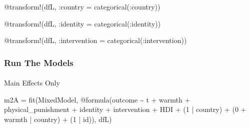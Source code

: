\documentclass[
  letterpaper,
  DIV=11,
  numbers=noendperiod]{scrreprt}
\makeatletter
\let\oldparagraph\paragraph
\renewcommand{\paragraph}{
    \@ifstar
      \xxxParagraphStar
      \xxxParagraphNoStar
  }
\newcommand{\xxxParagraphStar}[1]{\oldparagraph*{#1}\mbox{}}
\newcommand{\xxxParagraphNoStar}[1]{\oldparagraph{#1}\mbox{}}
\newenvironment{Shaded}{\begin{snugshade}}{\end{snugshade}}
\newcommand{\FloatTok}[1]{\textcolor[rgb]{0.68,0.00,0.00}{#1}}
\newcommand{\FunctionTok}[1]{\textcolor[rgb]{0.28,0.35,0.67}{#1}}
\newcommand{\NormalTok}[1]{\textcolor[rgb]{0.00,0.23,0.31}{#1}}
\newcommand{\OperatorTok}[1]{\textcolor[rgb]{0.37,0.37,0.37}{#1}}
\newcommand{\PreprocessorTok}[1]{\textcolor[rgb]{0.68,0.00,0.00}{#1}}
\makeatother
\begin{document}
\begin{Shaded}
\begin{Highlighting}[]
\PreprocessorTok{@transform}\NormalTok{!(dfL, }\OperatorTok{:}\NormalTok{country }\OperatorTok{=} \FunctionTok{categorical}\NormalTok{(}\OperatorTok{:}\NormalTok{country))}

\PreprocessorTok{@transform}\NormalTok{!(dfL, }\OperatorTok{:}\NormalTok{identity }\OperatorTok{=} \FunctionTok{categorical}\NormalTok{(}\OperatorTok{:}\NormalTok{identity))}

\PreprocessorTok{@transform}\NormalTok{!(dfL, }\OperatorTok{:}\NormalTok{intervention }\OperatorTok{=} \FunctionTok{categorical}\NormalTok{(}\OperatorTok{:}\NormalTok{intervention))}
\end{Highlighting}
\end{Shaded}

\subsubsection{Run The Models}\label{run-the-models-4}

\paragraph{Main Effects Only}\label{main-effects-only-2}

\begin{Shaded}
\begin{Highlighting}[]
\NormalTok{m2A }\OperatorTok{=} \FunctionTok{fit}\NormalTok{(MixedModel, }\PreprocessorTok{@formula}\NormalTok{(outcome }\OperatorTok{\textasciitilde{}}\NormalTok{ t }\OperatorTok{+}\NormalTok{ warmth }\OperatorTok{+} 
\NormalTok{                                 physical\_punishment }\OperatorTok{+} 
\NormalTok{                                 identity }\OperatorTok{+}\NormalTok{ intervention }\OperatorTok{+} 
\NormalTok{                                 HDI }\OperatorTok{+}
\NormalTok{                                 (}\FloatTok{1} \OperatorTok{|}\NormalTok{ country) }\OperatorTok{+} 
\NormalTok{                                 (}\FloatTok{0} \OperatorTok{+}\NormalTok{ warmth }\OperatorTok{|}\NormalTok{ country) }\OperatorTok{+}
\NormalTok{                                 (}\FloatTok{1} \OperatorTok{|}\NormalTok{ id)), dfL)}
\end{Highlighting}
\end{Shaded}
\end{document}
